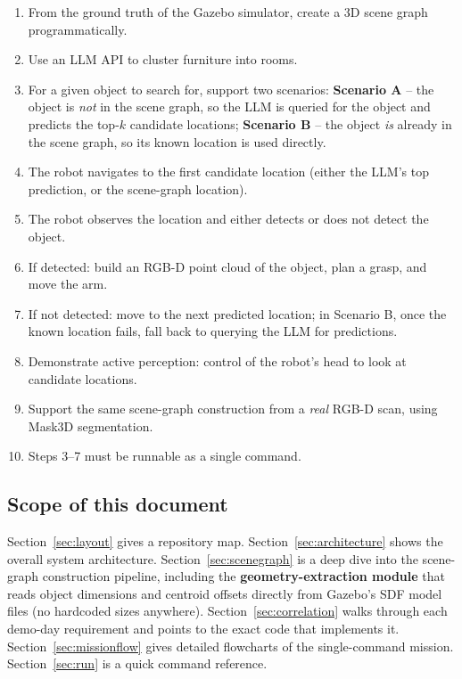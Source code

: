 \documentclass[11pt]{article}
\begin{document}
\begin{enumerate}[label=(\arabic*)]
  \item From the ground truth of the Gazebo simulator, create a 3D scene graph programmatically.
  \item Use an LLM API to cluster furniture into rooms.
  \item For a given object to search for, support two scenarios:
        \textbf{Scenario A} -- the object is \emph{not} in the scene graph, so
        the LLM is queried for the object and predicts the top-$k$ candidate
        locations; \textbf{Scenario B} -- the object \emph{is} already in the
        scene graph, so its known location is used directly.
  \item The robot navigates to the first candidate location (either the
        LLM's top prediction, or the scene-graph location).
  \item The robot observes the location and either detects or does not detect
        the object.
  \item If detected: build an RGB-D point cloud of the object, plan a grasp,
        and move the arm.
  \item If not detected: move to the next predicted location; in Scenario B,
        once the known location fails, fall back to querying the LLM for
        predictions.
  \item Demonstrate active perception: control of the robot's head to look at
        candidate locations.
  \item Support the same scene-graph construction from a \emph{real} RGB-D
        scan, using Mask3D segmentation.
  \item Steps 3--7 must be runnable as a single command.
\end{enumerate}

\subsection{Scope of this document}

Section~\ref{sec:layout} gives a repository map. Section~\ref{sec:architecture}
shows the overall system architecture. Section~\ref{sec:scenegraph} is a deep
dive into the scene-graph construction pipeline, including the
\textbf{geometry-extraction module} that reads object dimensions and centroid
offsets directly from Gazebo's SDF model files (no hardcoded sizes anywhere).
Section~\ref{sec:correlation} walks through each demo-day requirement and
points to the exact code that implements it. Section~\ref{sec:missionflow}
gives detailed flowcharts of the single-command mission. Section~\ref{sec:run}
is a quick command reference.
\end{document}

